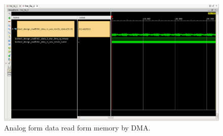 \begin{figure}[htbp]
    \centering
    \includegraphics[width=1\textwidth,
    trim={{.11\textwidth} {.95\textwidth} {.04\textwidth} {.15\textwidth}},
    clip]{./figures/ltedac_ila}
    \caption{ Analog form data read form memory by DMA.
    \label{fig:dataflowana}}
\end{figure}

\vfill
\clearpage

